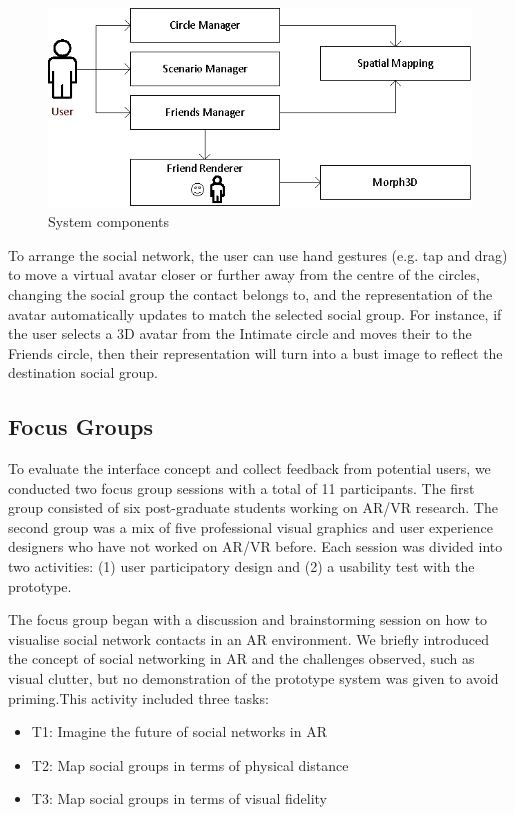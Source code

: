 \begin{figure}[ht]
  \centering
  \includegraphics[width=.8\linewidth]{images/mgia17/system-diagram.eps}
  \caption{System components}
    \label{fig:contacts:system-diagram}
\end{figure}

To arrange the social network, the user can use hand gestures (e.g. tap and drag) to move a virtual avatar closer or further away from the centre of the circles, changing the social group the contact belongs to, and the representation of the avatar automatically updates to match the selected social group. For instance, if the user selects a 3D avatar from the Intimate circle and moves their to the Friends circle, then their representation will turn into a bust image to reflect the destination social group.

\subsection{Focus Groups}

To evaluate the interface concept and collect feedback from potential users, we conducted two focus group sessions with a total of 11 participants. The first group consisted of six post-graduate students working on AR/VR research. The second group was a mix of five professional visual graphics and user experience designers who have not worked on AR/VR before. Each session was divided into two activities: (1) user participatory design and (2) a usability test with the prototype. 

The focus group began with a discussion and brainstorming session on how to visualise social network contacts in an AR environment. We briefly introduced the concept of social networking in AR and the challenges observed, such as visual clutter, but no demonstration of the prototype system was given to avoid priming.This activity included three tasks: 

\begin{itemize}
    \item T1: Imagine the future of social networks in AR 
    \item T2: Map social groups in terms of physical distance 
    \item T3: Map social groups in terms of visual fidelity 
\end{itemize}


